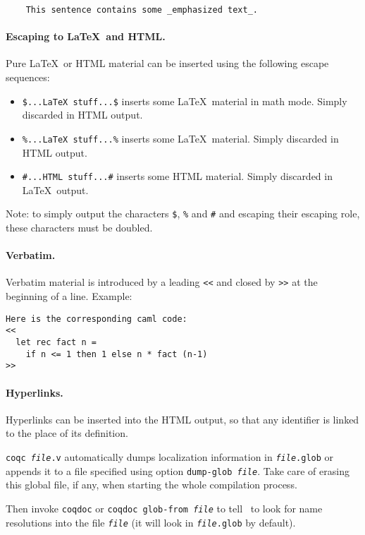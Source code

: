 \begin{verbatim}
    This sentence contains some _emphasized text_.
\end{verbatim}

\paragraph{Escaping to \LaTeX\ and HTML.}
Pure \LaTeX\ or HTML material can be inserted using the following
escape sequences:
\begin{itemize}
\item \verb+$...LaTeX stuff...$+ inserts some \LaTeX\ material in math mode.
  Simply discarded in HTML output.

\item \verb+%...LaTeX stuff...%+ inserts some \LaTeX\ material.
  Simply discarded in HTML output.

\item \verb+#...HTML stuff...#+ inserts some HTML material. Simply
  discarded in \LaTeX\ output.
\end{itemize}

Note: to simply output the characters \verb+$+, \verb+%+ and \verb+#+
and escaping their escaping role, these characters must be doubled.

\paragraph{Verbatim.} 
Verbatim material is introduced by a leading \verb+<<+ and closed by
\verb+>>+ at the beginning of a line. Example:
\begin{verbatim}
Here is the corresponding caml code:
<<
  let rec fact n = 
    if n <= 1 then 1 else n * fact (n-1)
>>
\end{verbatim}


\paragraph{Hyperlinks.}
Hyperlinks can be inserted into the HTML output, so that any
identifier is linked to the place of its definition.

\texttt{coqc \emph{file}.v} automatically dumps localization information
in \texttt{\emph{file}.glob} or appends it to a file specified using option
\texttt{\mm{}dump-glob \emph{file}}. Take care of erasing this global file, if
any, when starting the whole compilation process.

Then invoke \texttt{coqdoc} or \texttt{coqdoc \mm{}glob-from \emph{file}} to tell
\coqdoc\ to look for name resolutions into the file \texttt{\emph{file}}
(it will look in \texttt{\emph{file}.glob} by default).

